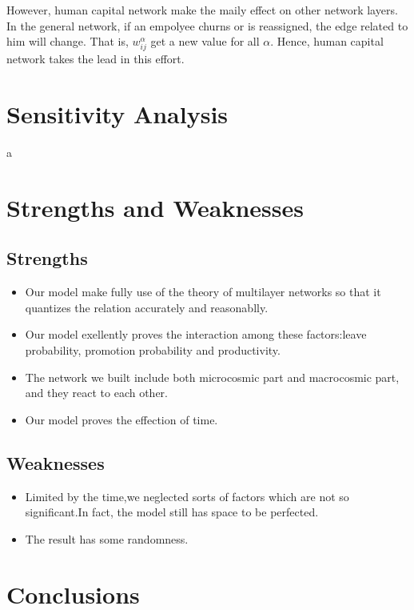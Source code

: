 \documentclass[12pt,a4paper,titlepage]{article}
\begin{document}
However, human capital network make the maily effect on other network
layers. In the general network, if an empolyee churns or is
reassigned, the edge related to him will change. That is,
$w_{ij}^\alpha$ get a new value for all $\alpha$. Hence, human capital
network takes the lead in this effort.

\section{Sensitivity Analysis}
\label{sec:sensitivity-analysis}

a

\section{Strengths and Weaknesses}
\label{sec:strengths-and-weaknesses}

\subsection*{Strengths}
\label{sec:strengths}

\begin{itemize}
\item Our model make fully use of the theory of multilayer networks so
  that it quantizes the relation accurately and reasonablly.
\item Our model exellently proves the interaction among these
  factors:leave probability, promotion probability and productivity.
\item The network we built include both microcosmic part and
  macrocosmic part, and they react to each other.
\item Our model proves the effection of time.
\end{itemize}

\subsection*{Weaknesses}
\label{sec:weaknesses}

\begin{itemize}
\item Limited by the time,we neglected sorts of factors which are not so significant.In fact, the model still has space to be perfected.
\item The result has some randomness.
\end{itemize}

\section{Conclusions}
\label{sec:conclusions}
\end{document}
